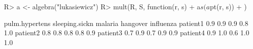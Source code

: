 \begin{Schunk}
% --begin: "comp.mult"
\begin{Sinput}
R> a <- algebra("lukasiewicz")
R> mult(R, S, function(r, s) {
+      a$s(a$pt(r, s))
+  })
\end{Sinput}
\begin{Soutput}
         pulm.hypertens sleeping.sickn malaria hangover influenza
patient1            0.9            0.9     0.9      0.8       1.0
patient2            0.8            0.8     0.8      0.8       0.9
patient3            0.7            0.9     0.7      0.9       0.9
patient4            0.9            1.0     0.6      1.0       1.0
\end{Soutput}
%
% --end: "comp.mult"
\end{Schunk}
